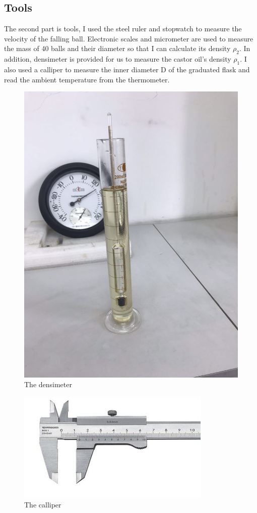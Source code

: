 \documentclass[12pt]{article}
\begin{document}
\subsection{Tools}
The second part is tools, I used the steel ruler and stopwatch to measure the velocity of the falling ball. Electronic scales and micrometer are used to measure the mass of 40 balls and their diameter so that I can calculate its density $\rho_2$. In addition, densimeter is provided for us to measure the castor oil's density $\rho_1$. I also used a calliper to measure the inner diameter D of the graduated flask and read the ambient temperature from the thermometer.
\begin{figure}[H]
\centering
\includegraphics[scale=0.2]{P2.jpg}
\caption{The densimeter}
\end{figure}
\begin{figure}[H]
\centering
\includegraphics{P3.jpg}
\caption{The calliper}
\end{figure}
\end{document}
